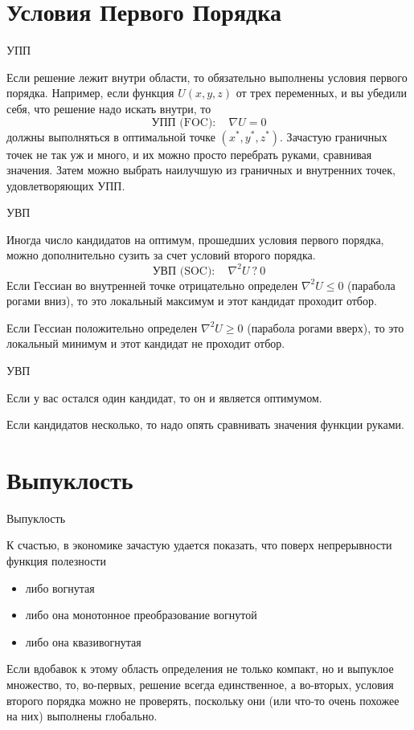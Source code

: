 \documentclass{beamer}
\begin{document}
\section{Условия Первого Порядка}

\begin{frame}{УПП}

Если решение лежит внутри области, то обязательно выполнены условия первого порядка. Например, если функция $U(x, y, z)$ от трех переменных, и вы убедили себя, что решение надо искать внутри, то
$$\text{УПП (FOC)}: \quad  \nabla U = 0$$ 
должны выполняться в оптимальной точке $(x^{\ast}, y^{\ast}, z^{\ast})$. Зачастую граничных точек не так уж и много, и их можно просто перебрать руками, сравнивая значения. Затем можно выбрать наилучшую из граничных и внутренних точек, удовлетворяющих УПП.

\end{frame}

\begin{frame}{УВП}

Иногда число кандидатов на оптимум, прошедших условия первого порядка, можно дополнительно сузить за счет условий второго порядка.
$$\text{УВП (SOC)}: \quad  \nabla^2 U \ ? \ 0$$
Если Гессиан во внутренней точке отрицательно определен $\nabla^2 U \leqslant 0$ (парабола рогами вниз), то это локальный максимум и этот кандидат проходит отбор. 

Если Гессиан положительно определен $\nabla^2 U \geqslant 0$ (парабола рогами вверх), то это локальный минимум и этот кандидат не проходит отбор.

\end{frame}

\begin{frame}{УВП}

Если у вас остался один кандидат, то он и является оптимумом. 

Если кандидатов несколько, то надо опять сравнивать значения функции руками.

\end{frame}

\section{Выпуклость}

\begin{frame}{Выпуклость}

К счастью, в экономике зачастую удается показать, что поверх непрерывности функция полезности

\begin{itemize}
\item либо вогнутая
\item либо она монотонное преобразование вогнутой
\item либо она квазивогнутая
\end{itemize}

Если вдобавок к этому область определения не только компакт, но и выпуклое множество, то, во-первых, решение всегда единственное, а во-вторых, условия второго порядка можно не проверять, поскольку они (или что-то очень похожее на них) выполнены глобально.

\end{frame}
\end{document}

